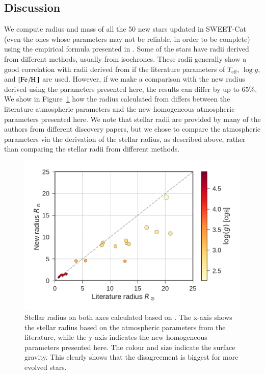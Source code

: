 \documentclass{aa}
\begin{document}
\subsection{Discussion}
\label{sec:Discussion}
We compute radius and mass of all the 50 new stars updated in SWEET-Cat (even
the ones whose parameters may not be reliable, in order to be complete) using
the empirical formula presented in \citet{Torres2010}. Some of the stars have
radii derived from different methods, usually from isochrones. These radii
generally show a good correlation with radii derived from \citet{Torres2010} if
the literature parameters of $T_\mathrm{eff}$, $\log g$, and
$[\ion{Fe}/\ion{H}]$ are used. However, if we make a comparison with the new
radius derived using the parameters presented here, the results can differ by up
to 65\%. We show in Figure~\ref{fig:RR} how the radius calculated from
\citet{Torres2010} differs between the literature atmospheric parameters and the
new homogeneous atmospheric parameters presented here. We note that stellar
radii are provided by many of the authors from different discovery papers, but
we chose to compare the atmospheric parameters via the derivation of the stellar
radius, as described above, rather than comparing the stellar radii from
different methods.

\begin{figure}[tpb]
    \centering
    \includegraphics[width=1.0\linewidth]{figures/radiusVSradius.pdf}
    \caption{Stellar radius on both axes calculated based on \citet{Torres2010}.
    The x-axis shows the stellar radius based on the atmospheric parameters
    from the literature, while the y-axis indicates the new homogeneous parameters
    presented here. The colour and size indicate the surface gravity. This clearly
    shows that the disagreement is biggest for more evolved stars.}
    \label{fig:RR}
\end{figure}
\end{document}
